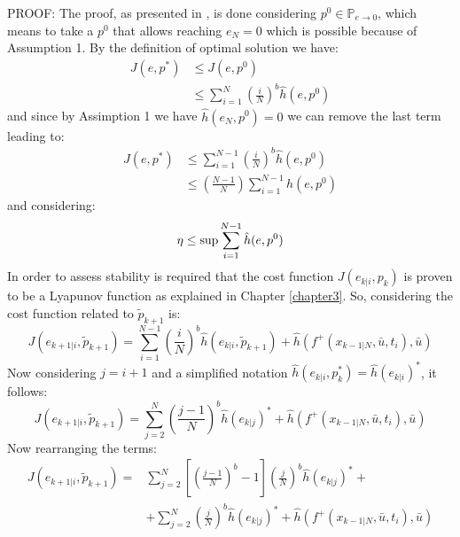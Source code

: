 {PROOF:} The proof, as presented in \cite{alamir2018stability}, is done considering $p^0 \in \mathbb{P}_{e \to 0}$, which means to take a $p^0$ that allows reaching $e_N=0$ which is possible because of Assumption 1. By the definition of optimal solution we have: 
\begin{equation}
\begin{split}
	J(e,p^*)&\leq J(e,p^0) \\
	&\leq \sum_{i=1}^{N}\left(\frac{i}{N}\right)^b\hat{h}(e,p^0)
\end{split}
\end{equation}
and since by Assimption 1 we have $\hat{h}(e_N,p^0)=0$ we can remove the last term leading to:
\begin{equation}
\begin{split}
	J(e,p^*)&\leq \sum_{i=1}^{N-1}\left(\frac{i}{N}\right)^b\hat{h}(e,p^0) \\
	&\leq \left(\frac{N-1}{N}\right)\sum_{i=1}^{N-1}\hat{h}(e,p^0)
\end{split}
\end{equation}
and considering:
\begin{equation}
 \eta \leq \textnormal{sup} \sum_{i=1}^{N-1}\hat{h}(e,p^0)
\end{equation}
In order to assess stability is required that the cost function $J({e}_{k|i},{p}_k)$ is proven to be a Lyapunov function as explained in Chapter \ref{chapter3}. So, considering the cost function related to $\tilde{p}_{k+1}$ is:
\begin{equation*}
    J({e}_{k+1|i},\tilde{p}_{k+1})=\sum_{i=1}^{N-1}\left(\frac{i}{N}\right)^b \hat{h}({e}_{k|i},\tilde{p}_{k+1})+\hat{h}\left(f^+(x_{k-1|N},\bar{u},t_i),\bar{u}\right)
\end{equation*}
Now considering $j=i+1$ and a simplified notation $\hat{h}({e}_{k|i},p_{k}^*)=\hat{h}(e_{k|i})^*$, it follows: 
\begin{equation*}
    J({e}_{k+1|i},\tilde{p}_{k+1})=\sum_{j=2}^{N}\left(\frac{j-1}{N}\right)^b \hat{h}(e_{k|j})^*+\hat{h}\left(f^+(x_{k-1|N},\bar{u},t_i),\bar{u}\right)
\end{equation*}
Now rearranging the terms: 
\begin{equation*}
    \begin{split}
        J({e}_{k+1|i},\tilde{p}_{k+1})=&\sum_{j=2}^{N}\left[\left(\frac{j-1}{N}\right)^b-1\right]\left(\frac{j}{N}\right)^b \hat{h}(e_{k|j})^*+ \\
        &+\sum_{j=2}^{N}\left(\frac{j}{N}\right)^b \hat{h}(e_{k|j})^* + \hat{h}\left(f^+(x_{k-1|N},\bar{u},t_i),\bar{u}\right)
    \end{split}
\end{equation*}
